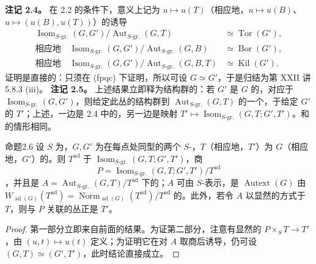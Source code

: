 \textbf{注记 2.4。} 在 2.2 的条件下，意义上记为 $u\mapsto u(T)$（相应地，$u\mapsto u(B)$、$u\mapsto(u(B),u(T))$）的诱导
\begin{align*}
\operatorname{Isom}_{S\text{-gr.}}(G,G')/\operatorname{Aut}_{S\text{-gr.}}(G,T)&\simeq\operatorname{Tor}(G'),\\
\text{相应地}\quad\operatorname{Isom}_{S\text{-gr.}}(G,G')/\operatorname{Aut}_{S\text{-gr.}}(G,B)&\simeq\operatorname{Bor}(G'),\\
\text{相应地}\quad\operatorname{Isom}_{S\text{-gr.}}(G,G')/\operatorname{Aut}_{S\text{-gr.}}(G,B,T)&\simeq\operatorname{Kil}(G').
\end{align*}
证明是直接的：只须在 (fpqc) 下证明，所以可设 $G\simeq G'$，于是归结为第 XXII 讲 5.8.3 (iii)。
\textbf{注记 2.5。} 上述结果立即释为结构群的：若 $G'$ 是 $G$ 的，对应于 $\operatorname{Isom}_{S\text{-gr.}}(G,G')$，则给定此丛的结构群到 $\operatorname{Aut}_{S\text{-gr.}}(G,T)$ 的一个，于给定 $G'$ 的 $T'$；上述，一边是 2.4 中的，另一边是映射 $T'\mapsto\operatorname{Isom}_{S\text{-gr.}}(G,T;G',T')$。和的情形相同。
\begin{SGAresult}{命题}{2.6}
设 $S$ 为，$G,G'$ 为在每点处同型的两个 $S$-，$T$（相应地，$T'$）为 $G$（相应地，$G'$）的。则 $T^{\mathrm{ad}}$ 于 $\operatorname{Isom}_{S\text{-gr.}}(G,T;G',T')$，商
\[P=\operatorname{Isom}_{S\text{-gr.}}(G,T;G',T')/T^{\mathrm{ad}}\]
，并且是 $A=\operatorname{Aut}_{S\text{-gr.}}(G,T)/T^{\mathrm{ad}}$ 下的；$A$ 可由 $S$-表示，是 $\operatorname{Autext}(G)$ 由 $W_{\operatorname{ad}(G)}(T^{\mathrm{ad}})=\operatorname{Norm}_{\operatorname{ad}(G)}(T^{\mathrm{ad}})/T^{\mathrm{ad}}$ 的。此外，若令 $A$ 以显然的方式于 $T$，则与 $P$ 关联的丛正是 $T'$。
\end{SGAresult}
\begin{proof}
第一部分立即来自前面的结果。为证第二部分，注意有显然的 $P\times_ST\to T'$，由 $(u,t)\mapsto u(t)$ 定义；为证明它在对 $A$ 取商后诱导，仍可设 $(G,T)\simeq(G',T')$，此时结论直接成立。
\end{proof}
